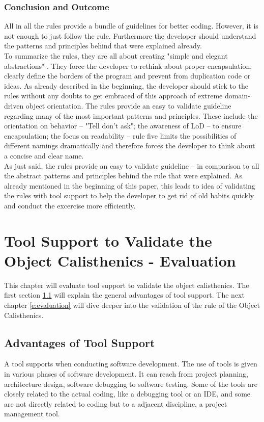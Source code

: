 \subsection*{Conclusion and Outcome}
All in all the rules provide a bundle of guidelines for better coding. However, it is not enough to just follow the rule. Furthermore the developer should understand the patterns and principles behind that were explained already. 
\\

To summarize the rules, they are all about creating "simple and elegant abstractions" \cite[p. 80]{oc2008}. They force the developer to rethink about proper encapsulation, clearly define the borders of the program and prevent from duplication code or ideas. As already described in the beginning, the developer should stick to the rules without any doubts to get embraced of this approach of extreme domain-driven object orientation. The rules provide an easy to validate guideline regarding many of the most important patterns and principles. These include the orientation on behavior -- "Tell don't ask"; the awareness of \ac{LoD} -- to ensure encapsulation; the focus on readability -- rule five limits the possibilities of different namings dramatically and therefore forces the developer to think about a concise and clear name. 
\\

As just said, the rules provide an easy to validate guideline -- in comparison to all the abstract patterns and principles behind the rule that were explained. As already mentioned in the beginning of this paper, this leads to idea of validating the rules with tool support to help the developer to get rid of old habits quickly and conduct the excercise more efficiently. 







\chapter{Tool Support to Validate the Object Calisthenics - Evaluation}
\label{Evaluation}
This chapter will evaluate tool support to validate the object calisthenics. The first section \ref{e:advantages} will explain the general advantages of tool support. The next chapter \ref{e:evaluation} will dive deeper into the validation of the rule of the Object Calisthenics.

\section{Advantages of Tool Support}
\label{e:advantages}
A tool supports when conducting software development. The use of tools is given in various phases of software development. It can reach from project planning, architecture design, software debugging to software testing. Some of the tools are closely related to the actual coding, like a debugging tool or an \acf{IDE}, and some are not directly related to coding but to a adjacent discipline, a project management tool. 

